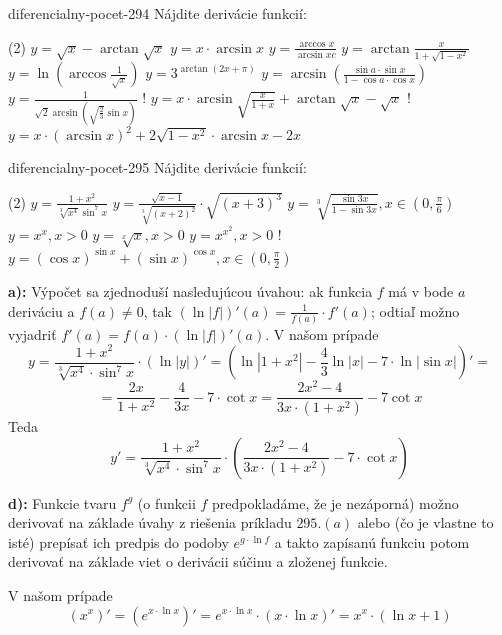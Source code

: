 \begin{defproblem}{diferencialny-pocet-294}
Nájdite derivácie funkcií:
\begin{tasks}(2)
    \task $y=\sqrt{x}-\arctan\sqrt{x}$
    \task $y=x\cdot\arcsin x$
    \task $y=\frac{\arccos x}{\arcsin xc}$
    \task $y=\arctan \frac{x}{1+\sqrt{1-x^2}}$
    \task $y=\ln (\arccos \frac{1}{\sqrt{x}})$
    \task $y=3^{\arctan(2x+\pi)}$
    \task $y=\arcsin(\frac{\sin a\cdot \sin x}{1-\cos a\cdot\cos x})$
    \task $y=\frac{1}{\sqrt{2}\arcsin(\sqrt{\frac{2}{3}}\sin x)}$
    \task! $y=x\cdot\arcsin \sqrt{\frac{x}{1+x}}+\arctan \sqrt{x}-\sqrt{x}$
    \task! $y=x\cdot(\arcsin x)^2+2\sqrt{1-x^2}\cdot\arcsin x-2x$
\end{tasks}
\end{defproblem}

\begin{defproblem}{diferencialny-pocet-295}
Nájdite derivácie funkcií:
\begin{tasks}(2)
    \task $y=\frac{1+x^2}{\sqrt[3]{x^4}\sin^7 x}$
    \task $y=\frac{\sqrt{x-1}}{\sqrt[3]{(x+2)^2}}\cdot\sqrt{(x+3)^3}$
    \task $y=\sqrt[3]{\frac{\sin 3x}{1-\sin 3x}},x\in(0,\frac{\pi}{6})$
    \task $y=x^x,x>0$
    \task $y=\sqrt[x]{x},x>0$
    \task $y=x^{x^2},x>0$
    \task! $y=(\cos x)^{\sin x}+(\sin x)^{\cos x},x\in(0,\frac{\pi}{2})$
\end{tasks}

\begin{solution}
  \textbf{a):}
  Výpočet sa zjednoduší nasledujúcou úvahou: ak funkcia $f$ má v bode $a$
  deriváciu a $f(a)\neq 0$, tak $(\ln |f|)'(a)=\frac{1}{f(a)}\cdot f'(a)$;
  odtiaľ možno vyjadriť $f'(a)=f(a)\cdot (\ln |f|)'(a)$. V našom prípade
  \[
    y=\frac{1+x^2}{\sqrt[3]{x^4}\cdot\sin^7 x}\cdot (\ln |y|)'
    = (\ln |1+x^2|-\frac{4}{3}\ln |x|-7\cdot\ln |\sin x|)' =
  \]
  \[
    = \frac{2x}{1+x^2}-\frac{4}{3x}-7\cdot \cot x
    = \frac{2x^2-4}{3x\cdot (1+x^2)}-7\cot x
  \]
  Teda
  \[
    y'=\frac{1+x^2}{\sqrt[3]{x^4}\cdot \sin^7 x}\cdot
    (\frac{2x^2-4}{3x\cdot (1+x^2)}-7\cdot\cot x)
  \]

  \textbf{d):}
  Funkcie tvaru $f^g$ (o funkcii $f$ predpokladáme, že je nezáporná) možno
  derivovať na základe úvahy z riešenia príkladu $295.(a)$ alebo (čo je vlastne
  to isté) prepísať ich predpis do podoby $e^{g\cdot\ln f}$ a takto zapísanú
  funkciu potom derivovať na základe viet o derivácii súčinu a zloženej funkcie.

  V našom prípade
  \[
    (x^x)'=(e^{x\cdot\ln x})'=e^{x\cdot\ln x}\cdot(x\cdot\ln x)'
    = x^x\cdot(\ln x +1)
  \]
\end{solution}
\end{defproblem}


